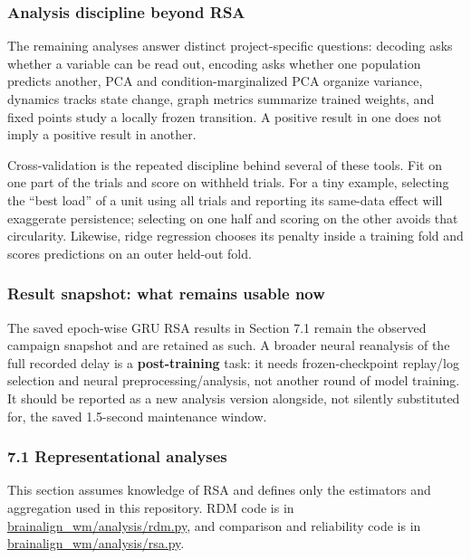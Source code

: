\documentclass[
  10pt,
]{article}
\begin{document}
\hypertarget{analysis-discipline-beyond-rsa}{%
\subsubsection{Analysis discipline beyond
RSA}\label{analysis-discipline-beyond-rsa}}

The remaining analyses answer distinct project-specific questions:
decoding asks whether a variable can be read out, encoding asks whether
one population predicts another, PCA and condition-marginalized PCA
organize variance, dynamics tracks state change, graph metrics summarize
trained weights, and fixed points study a locally frozen transition. A
positive result in one does not imply a positive result in another.

Cross-validation is the repeated discipline behind several of these
tools. Fit on one part of the trials and score on withheld trials. For a
tiny example, selecting the ``best load'' of a unit using all trials and
reporting its same-data effect will exaggerate persistence; selecting on
one half and scoring on the other avoids that circularity. Likewise,
ridge regression chooses its penalty inside a training fold and scores
predictions on an outer held-out fold.

\hypertarget{result-snapshot-what-remains-usable-now}{%
\subsubsection{Result snapshot: what remains usable
now}\label{result-snapshot-what-remains-usable-now}}

The saved epoch-wise GRU RSA results in Section 7.1 remain the observed
campaign snapshot and are retained as such. A broader neural reanalysis
of the full recorded delay is a \textbf{post-training} task: it needs
frozen-checkpoint replay/log selection and neural
preprocessing/analysis, not another round of model training. It should
be reported as a new analysis version alongside, not silently
substituted for, the saved 1.5-second maintenance window.

\hypertarget{representational-analyses}{%
\subsubsection{7.1 Representational
analyses}\label{representational-analyses}}

This section assumes knowledge of RSA and defines only the estimators
and aggregation used in this repository. RDM code is in
\url{brainalign_wm/analysis/rdm.py}, and comparison and reliability code
is in \url{brainalign_wm/analysis/rsa.py}.
\end{document}
